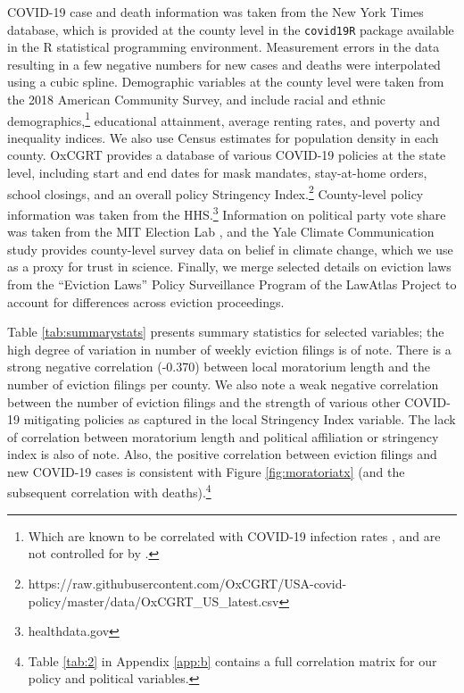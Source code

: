 \documentclass[12pt]{amsart}
\begin{document}
COVID-19 case and death information was taken from the New York Times database, which is provided at the county level in the {\tt covid19R} package available in the R statistical programming environment. Measurement errors in the data resulting in a few negative numbers for new cases and deaths were interpolated using a cubic spline. Demographic variables at the county level were taken from the 2018 American Community Survey, and include racial and ethnic demographics,\footnote{Which are known to be correlated with COVID-19 infection rates \cite{millett2020assessing,mahajan2020racial}, and are not controlled for by .} educational attainment, average renting rates, and poverty and inequality indices. We also use Census estimates for population density in each county. OxCGRT provides a database of various COVID-19 policies at the state level, including start and end dates for mask mandates, stay-at-home orders, school closings, and an overall policy Stringency Index.\footnote{https://raw.githubusercontent.com/OxCGRT/USA-covid-policy/master/data/OxCGRT\_US\_latest.csv} County-level policy information was taken from the HHS.\footnote{healthdata.gov} Information on political party vote share was taken from the MIT Election Lab \cite{DVN/LYWX3D_2018}, and the Yale Climate Communication study \cite{yaleclimate} provides county-level survey data on belief in climate change, which we use as a proxy for trust in science. Finally, we merge selected details on eviction laws from the ``Eviction Laws'' Policy Surveillance Program of the LawAtlas Project to account for differences across eviction proceedings. 

Table \ref{tab:summarystats} presents summary statistics for selected variables; the high degree of variation in number of weekly eviction filings is of note. There is a strong negative correlation (-0.370) between local moratorium length and the number of eviction filings per county. We also note a weak negative correlation between the number of eviction filings and the strength of various other COVID-19 mitigating policies as captured in the local Stringency Index variable. The lack of correlation between moratorium length and political affiliation or stringency index is also of note. Also, the positive correlation between eviction filings and new COVID-19 cases is consistent with Figure \ref{fig:moratoriatx} (and the subsequent correlation with deaths).\footnote{Table \ref{tab:2} in Appendix \ref{app:b} contains a full correlation matrix for our policy and political variables.} 
\end{document}
